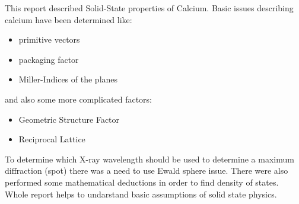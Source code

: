 This report described Solid-State properties of Calcium. Basic issues describing calcium have been determined like:
\begin{itemize}
\item primitive vectors
\item packaging factor
\item Miller-Indices of the planes
\end{itemize}
and also some more complicated factors:
\begin{itemize}
\item Geometric Structure Factor
\item Reciprocal Lattice
\end{itemize}
To determine which X-ray wavelength should be used to determine a maximum diffraction (spot) there was a need to use Ewald sphere issue. There were also performed some mathematical deductions in order to find density of states. Whole report helps to undarstand basic assumptions of solid state physics.